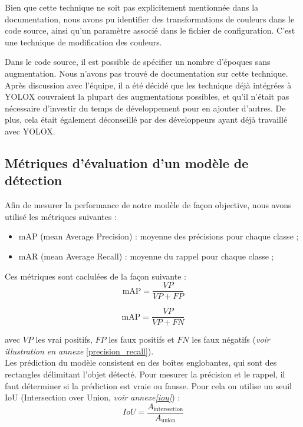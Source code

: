 Bien que cette technique ne soit pas explicitement mentionnée dans la documentation,
nous avons pu identifier des transformations de couleurs dans le code source,
ainsi qu'un paramètre associé dans le fichier de configuration.
C'est une technique de modification des couleurs.

Dans le code source, il est possible de spécifier un nombre d'époques sans augmentation.
Nous n'avons pas trouvé de documentation sur cette technique.\\

Après discussion avec l'équipe, il a été décidé que les technique déjà intégrées à YOLOX
couvraient la plupart des augmentations possibles, et qu'il n'était pas nécessaire d'investir
du temps de développement pour en ajouter d'autres. De plus, cela était également déconseillé
par des développeurs ayant déjà travaillé avec YOLOX.\\

\subsection{Métriques d'évaluation d'un modèle de détection}

Afin de mesurer la performance de notre modèle de façon objective,
nous avons utilisé les métriques suivantes :
\begin{itemize}
    \item mAP (mean Average Precision) : moyenne des précisions pour chaque classe ;
    \item mAR (mean Average Recall) : moyenne du rappel pour chaque classe ;
\end{itemize}

Ces métriques sont caclulées de la façon suivante :\\

$$
\text{mAP} = \frac{VP}{VP + FP}
$$

$$
\text{mAP} = \frac{VP}{VP + FN}
$$

avec $VP$ les vrai positifs, $FP$ les faux positifs et $FN$ les faux négatifs (\textit{voir illustration en annexe }
\ref{precision_recall}).\\

Les prédiction du modèle consistent en des boîtes englobantes, qui sont des rectangles délimitant
l'objet détecté. Pour mesurer la précision et le rappel, il faut déterminer si la prédiction
est vraie ou fausse. Pour cela on utilise un seuil IoU (Intersection over Union,
\textit{voir annexe\ref{iou}}) :
\[
    IoU = \frac{A_{\text{intersection}}}{A_{\text{union}}}
\]

